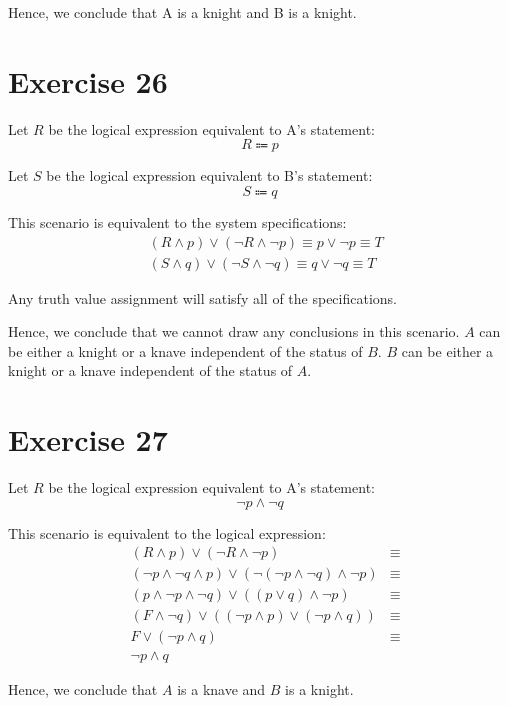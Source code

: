 \documentclass{article}
\begin{document}
Hence, we conclude that A is a knight and B is a knight.

\pagebreak

\section{Exercise 26}
Let $R$ be the logical expression equivalent to A's statement:
\[
	R \Coloneqq p
\]

Let $S$ be the logical expression equivalent to B's statement:
\[
	S \Coloneqq q
\]

This scenario is equivalent to the system specifications:
\begin{align*}
	 & (R \land p) \lor (\neg R \land \neg p) \equiv p \lor \neg p \equiv T \\
	 & (S \land q) \lor (\neg S \land \neg q) \equiv q \lor \neg q \equiv T
\end{align*}

Any truth value assignment will satisfy all of the specifications.

Hence, we conclude that we cannot draw any conclusions in this scenario. $A$ can be either a knight or a knave independent of the status of $B$. $B$ can be either a knight or a knave independent of the status of $A$.

\pagebreak

\section{Exercise 27}
Let $R$ be the logical expression equivalent to A's statement:
\[
	\neg p \land \neg q
\]

This scenario is equivalent to the logical expression:
\begin{align*}
	 & (R \land p) \lor (\neg R \land \neg p)                                       & \equiv \\
	 & (\neg p \land \neg q \land p) \lor (\neg (\neg p \land \neg q) \land \neg p) & \equiv \\
	 & (p \land \neg p \land \neg q) \lor ((p \lor q) \land \neg p)                 & \equiv \\
	 & (F \land \neg q) \lor ((\neg p \land p) \lor (\neg p \land q))               & \equiv \\
	 & F \lor (\neg p \land q)                                                      & \equiv \\
	 & \neg p \land q
\end{align*}

Hence, we conclude that $A$ is a knave and $B$ is a knight.
\end{document}

